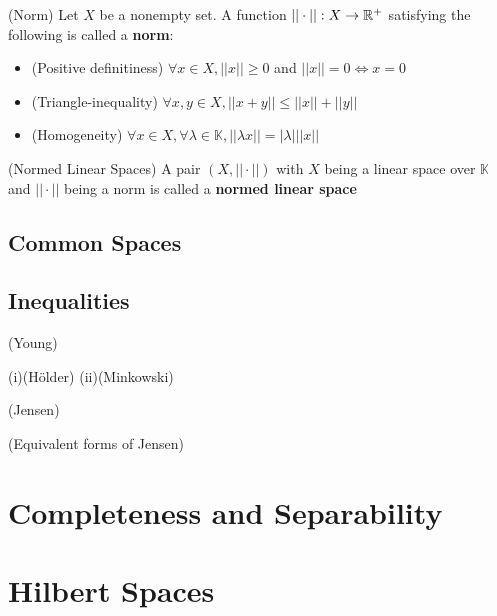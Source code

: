 \documentclass{article}
\begin{document}
\begin{defn}
    (Norm) Let $X$ be a nonempty set. A function $||\cdot||: X \to \mathbb{R}^+$ satisfying the following 
    is called a \textbf{norm}:
    \begin{itemize}
        \item (Positive definitiness) $\forall x \in X, ||x|| \geq 0$ and $||x||=0 \iff x=0$
        \item (Triangle-inequality) $\forall x,y \in X, ||x+y|| \leq ||x|| + ||y||$
        \item (Homogeneity) $\forall x \in X, \forall \lambda \in \mathbb{K}, ||\lambda x|| = |\lambda| ||x||$
    \end{itemize}
\end{defn}

\begin{defn}
(Normed Linear Spaces) A pair $(X, ||\cdot||)$ with $X$ being a linear space over $\mathbb{K}$ and 
                    $||\cdot||$ being a norm is called a \textbf{normed linear space}
\end{defn} 



\subsection{Common Spaces}
\subsection{Inequalities}

\begin{prop}
(Young)
\end{prop}

\begin{cor}
(i)(Hölder)
(ii)(Minkowski)
\end{cor}

\begin{prop}
(Jensen)
\end{prop}

\begin{prop}
(Equivalent forms of Jensen)
\end{prop}  

\section{Completeness and Separability}  

\section{Hilbert Spaces}  
\end{document}
